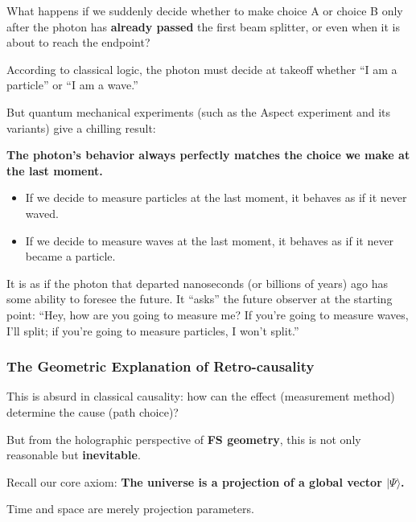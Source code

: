What happens if we suddenly decide whether to make choice A or choice B only after the photon has \textbf{already passed} the first beam splitter, or even when it is about to reach the endpoint?

According to classical logic, the photon must decide at takeoff whether ``I am a particle'' or ``I am a wave.''

But quantum mechanical experiments (such as the Aspect experiment and its variants) give a chilling result:

\textbf{The photon's behavior always perfectly matches the choice we make at the last moment.}

\begin{itemize}
\item If we decide to measure particles at the last moment, it behaves as if it never waved.

\item If we decide to measure waves at the last moment, it behaves as if it never became a particle.
\end{itemize}

It is as if the photon that departed nanoseconds (or billions of years) ago has some ability to foresee the future. It ``asks'' the future observer at the starting point: ``Hey, how are you going to measure me? If you're going to measure waves, I'll split; if you're going to measure particles, I won't split.''

\subsubsection{The Geometric Explanation of Retro-causality}

This is absurd in classical causality: how can the effect (measurement method) determine the cause (path choice)?

But from the holographic perspective of \textbf{FS geometry}, this is not only reasonable but \textbf{inevitable}.

Recall our core axiom: \textbf{The universe is a projection of a global vector $|\Psi\rangle$.}

Time and space are merely projection parameters.

